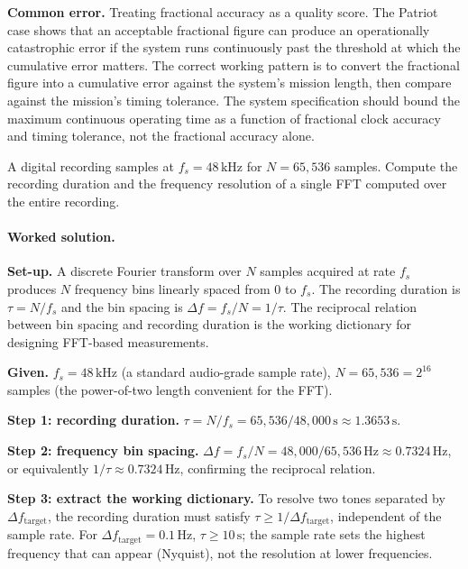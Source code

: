 \begin{exercise}
\textbf{Common error.} Treating fractional accuracy as a quality
score. The Patriot case shows that an acceptable fractional
figure can produce an operationally catastrophic error if the
system runs continuously past the threshold at which the
cumulative error matters. The correct working pattern is to
convert the fractional figure into a cumulative error against the
system's mission length, then compare against the mission's
timing tolerance. The system specification should bound the
maximum continuous operating time as a function of fractional
clock accuracy and timing tolerance, not the fractional accuracy
alone.
\end{exercise}

\begin{exercise}
A digital recording samples at $f_{s} = 48 \,\si{\kilo\hertz}$ for
$N = 65{,}536$ samples. Compute the recording duration and the
frequency resolution of a single FFT computed over the entire
recording.

\paragraph{Worked solution.}
\textbf{Set-up.} A discrete Fourier transform over $N$ samples
acquired at rate $f_{s}$ produces $N$ frequency bins linearly
spaced from $0$ to $f_{s}$. The recording duration is
$\tau = N/f_{s}$ and the bin spacing is $\Delta f = f_{s}/N = 1/
\tau$. The reciprocal relation between bin spacing and recording
duration is the working dictionary for designing FFT-based
measurements.

\textbf{Given.} $f_{s} = 48 \,\si{\kilo\hertz}$ (a standard
audio-grade sample rate), $N = 65{,}536 = 2^{16}$ samples (the
power-of-two length convenient for the FFT).

\textbf{Step 1: recording duration.} $\tau = N/f_{s} = 65{,}536/
48{,}000 \,\si{\second} \approx 1.3653 \,\si{\second}$.

\textbf{Step 2: frequency bin spacing.} $\Delta f = f_{s}/N =
48{,}000/65{,}536 \,\si{\hertz} \approx 0.7324 \,\si{\hertz}$, or
equivalently $1/\tau \approx 0.7324 \,\si{\hertz}$, confirming
the reciprocal relation.

\textbf{Step 3: extract the working dictionary.} To resolve two
tones separated by $\Delta f_{\text{target}}$, the recording
duration must satisfy $\tau \geq 1/\Delta f_{\text{target}}$,
independent of the sample rate. For $\Delta f_{\text{target}} =
0.1 \,\si{\hertz}$, $\tau \geq 10 \,\si{\second}$; the sample
rate sets the highest frequency that can appear (Nyquist), not
the resolution at lower frequencies.


\end{exercise}
